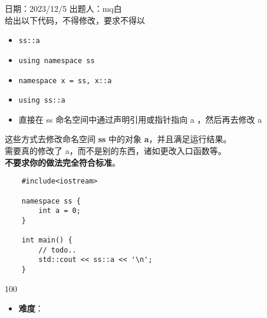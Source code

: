 日期：2023/12/5 出题人：mq白\\

给出以下代码，不得修改，要求不得以

\begin{itemize}
    \item \texttt{ss::a}
    
    \item \texttt{using namespace ss}
    
    \item \texttt{namespace x = ss, x::a}
    
    \item \texttt{using ss::a}
    
    \item 直接在 ss 命名空间中通过声明引用或指针指向 a ，然后再去修改 a
\end{itemize}

这些方式去修改命名空间 \textbf{ss} 中的对象 \textbf{a}，并且满足运行结果。\\

需要真的修改了 a，而不是别的东西，诸如更改入口函数等。\\

\textbf{不要求你的做法完全符合标准}。

\begin{verbatim}
    #include<iostream>

    namespace ss {
        int a = 0;
    }

    int main() {
        // todo..
        std::cout << ss::a << '\n'; 
    }
\end{verbatim}

\begin{tcolorbox}[title = {运行结果},
    fonttitle = \bfseries, fontupper = \sffamily, fontlower = \itshape]
    100
\end{tcolorbox}

\begin{itemize}
    \item \textbf{难度}： 
\end{itemize}